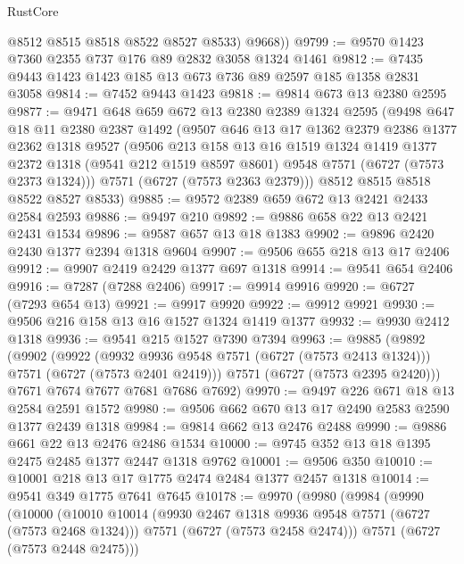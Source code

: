 \begin{lexlean}{RustCore}
\begin{coremodule}
          @8512
          @8515
          @8518
          @8522
          @8527
          @8533)
        @9668))
@9799 := @9570 @1423 @7360 @2355 @737 @176 @89 @2832 @3058 @1324 @1461
@9812 := @7435 @9443 @1423 @1423 @185 @13 @673 @736 @89 @2597 @185 @1358 @2831 @3058
@9814 := @7452 @9443 @1423
@9818 := @9814 @673 @13 @2380 @2595
@9877 := @9471
    @648
    @659
    @672
    @13
    @2380
    @2389
    @1324
    @2595
    (@9498
      @647
      @18
      @11
      @2380
      @2387
      @1492
      (@9507
        @646
        @13
        @17
        @1362
        @2379
        @2386
        @1377
        @2362
        @1318
        @9527
        (@9506
          @213
          @158
          @13
          @16
          @1519
          @1324
          @1419
          @1377
          @2372
          @1318
          (@9541 @212 @1519 @8597 @8601)
          @9548
          @7571
          (@6727 (@7573 @2373 @1324)))
        @7571
        (@6727 (@7573 @2363 @2379)))
      @8512
      @8515
      @8518
      @8522
      @8527
      @8533)
@9885 := @9572 @2389 @659 @672 @13 @2421 @2433 @2584 @2593
@9886 := @9497 @210
@9892 := @9886 @658 @22 @13 @2421 @2431 @1534
@9896 := @9587 @657 @13 @18 @1383
@9902 := @9896 @2420 @2430 @1377 @2394 @1318 @9604
@9907 := @9506 @655 @218 @13 @17 @2406
@9912 := @9907 @2419 @2429 @1377 @697 @1318
@9914 := @9541 @654 @2406
@9916 := @7287 (@7288 @2406)
@9917 := @9914 @9916
@9920 := @6727 (@7293 @654 @13)
@9921 := @9917 @9920
@9922 := @9912 @9921
@9930 := @9506 @216 @158 @13 @16 @1527 @1324 @1419 @1377
@9932 := @9930 @2412 @1318
@9936 := @9541 @215 @1527 @7390 @7394
@9963 := @9885
    (@9892
      (@9902
        (@9922
          (@9932 @9936 @9548 @7571 (@6727 (@7573 @2413 @1324)))
          @7571
          (@6727 (@7573 @2401 @2419)))
        @7571
        (@6727 (@7573 @2395 @2420)))
      @7671
      @7674
      @7677
      @7681
      @7686
      @7692)
@9970 := @9497 @226 @671 @18 @13 @2584 @2591 @1572
@9980 := @9506 @662 @670 @13 @17 @2490 @2583 @2590 @1377 @2439 @1318
@9984 := @9814 @662 @13 @2476 @2488
@9990 := @9886 @661 @22 @13 @2476 @2486 @1534
@10000 := @9745 @352 @13 @18 @1395 @2475 @2485 @1377 @2447 @1318 @9762
@10001 := @9506 @350
@10010 := @10001 @218 @13 @17 @1775 @2474 @2484 @1377 @2457 @1318
@10014 := @9541 @349 @1775 @7641 @7645
@10178 := @9970
    (@9980
      (@9984
        (@9990
          (@10000
            (@10010
              @10014
              (@9930 @2467 @1318 @9936 @9548 @7571 (@6727 (@7573 @2468 @1324)))
              @7571
              (@6727 (@7573 @2458 @2474)))
            @7571
            (@6727 (@7573 @2448 @2475)))

\end{coremodule}
\end{lexlean}
